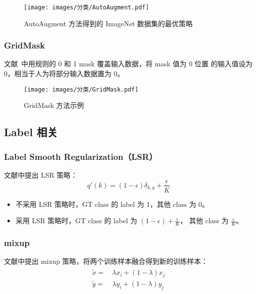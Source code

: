 \begin{figure}[ht]
  \centering
  \texttt{[image: images/分类/AutoAugment.pdf]}
  \caption{AutoAugment 方法得到的 ImageNet 数据集的最优策略}\label{fig:autoaugment}
\end{figure}


\subsubsection{GridMask}
文献~中用规则的 0 和 1 mask 覆盖输入数据，将 mask 值为 0 位置
的输入值设为 0，相当于人为将部分输入数据置为 0。

\begin{figure}[ht]
  \centering
  \texttt{[image: images/分类/GridMask.pdf]}
  \caption{GridMask 方法示例}\label{fig:gridmask}
\end{figure}

\subsection{Label 相关}
\subsubsection{Label Smooth Regularization（LSR）}
文献中提出 LSR 策略：
\begin{equation}
  q'(k) = (1-\epsilon) \delta_{k,y} + \frac{\epsilon}{K}
\end{equation}

\begin{itemize}
  \item 不采用 LSR 策略时，GT class 的 label 为 1，其他 class 为 0。
  \item 采用 LSR 策略时，GT class 的 label 为 $(1-\epsilon) + \frac{\epsilon}{K}$，
    其他 class 为 $\frac{\epsilon}{K}$。
\end{itemize}

\subsubsection{mixup}
文献中提出 mixup 策略，将两个训练样本融合得到新的训练样本：
\begin{align}
  \begin{split}
    \tilde{x} = & \, \lambda x_i + (1-\lambda) x_j  \\
    \tilde{y} = & \, \lambda y_i + (1-\lambda) y_j  \\
  \end{split}
\end{align}

